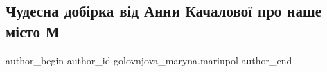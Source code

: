  
 
 
 
 

\subsection{Чудесна добірка від Анни Качалової про наше місто М}
\label{sec:02_05_2022.fb.golovnjova_maryna.mariupol.1.chudesna_dob_rka_v_d}

\ifcmt
 author_begin
   author_id golovnjova_maryna.mariupol
 author_end
\fi
